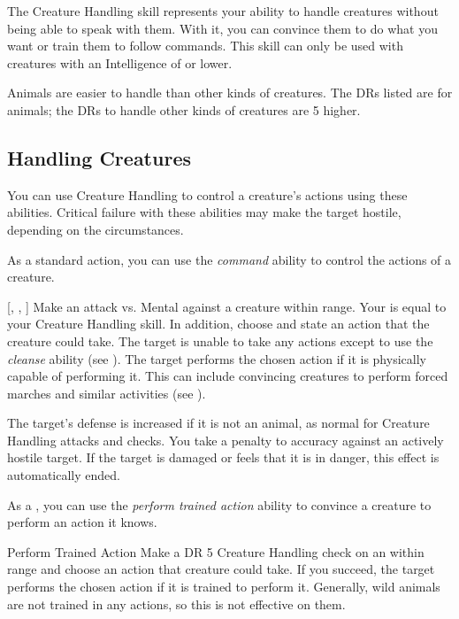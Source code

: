 \newpage
{}
    The Creature Handling skill represents your ability to handle creatures without being able to speak with them. With it, you can convince them to do what you want or train them to follow commands. This skill can only be used with creatures with an Intelligence of  or lower.

        Animals are easier to handle than other kinds of creatures.
        The DRs listed are for animals; the DRs to handle other kinds of creatures are 5 higher.

    \subsection{Handling Creatures}
        You can use Creature Handling to control a creature's actions using these abilities.
        Critical failure with these abilities may make the target hostile, depending on the circumstances.

        As a standard action, you can use the \textit{command} ability to control the actions of a creature.

        \begin{freeability}{}[, , ]
            Make an attack vs. Mental against a creature within \rngmed range.
            Your  is equal to your Creature Handling skill.
            In addition, choose and state an action that the creature could take.
            \hit The target is unable to take any actions except to use the \textit{cleanse} ability (see ).
            \crit The target performs the chosen action if it is physically capable of performing it.
            This can include convincing creatures to perform forced marches and similar activities (see ).
            
            The target's defense is increased if it is not an animal, as normal for Creature Handling attacks and checks.
            You take a  penalty to accuracy against an actively hostile target.
            If the target is damaged or feels that it is in danger, this effect is automatically ended.
        \end{freeability}

        As a , you can use the \textit{perform trained action} ability to convince a creature to perform an action it knows.

        \begin{freeability}{Perform Trained Action}
            Make a DR 5 Creature Handling check on an  within \rnglong range and choose an action that creature could take.
            If you succeed, the target performs the chosen action if it is trained to perform it.
            Generally, wild animals are not trained in any actions, so this is not effective on them.
        \end{freeability}

